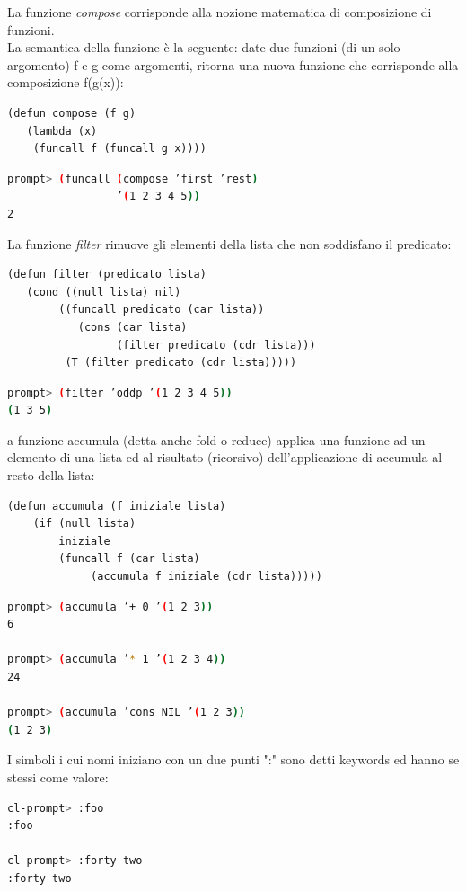 \documentclass[a4paper,12pt, oneside]{book}
\begin{document}
La funzione \textit{compose} corrisponde alla nozione matematica di
composizione di funzioni. \\La semantica della funzione è la seguente: date due funzioni (di
un solo argomento) f e g come argomenti, ritorna una nuova
funzione che corrisponde alla composizione f(g(x)):
\begin{verbatim}
(defun compose (f g)
   (lambda (x)
    (funcall f (funcall g x))))
\end{verbatim}
\begin{shaded}
\begin{lstlisting}[language=bash]
prompt> (funcall (compose ’first ’rest)
                 ’(1 2 3 4 5))
2
\end{lstlisting}
\end{shaded}
La funzione \textit{filter} rimuove gli elementi della lista che non soddisfano il predicato:
\begin{verbatim}
(defun filter (predicato lista)
   (cond ((null lista) nil)
        ((funcall predicato (car lista))
           (cons (car lista)
                 (filter predicato (cdr lista)))
         (T (filter predicato (cdr lista)))))
\end{verbatim}
\begin{shaded}
\begin{lstlisting}[language=bash]
prompt> (filter ’oddp ’(1 2 3 4 5))
(1 3 5)
\end{lstlisting}
\end{shaded}
a funzione accumula (detta anche fold o reduce) applica una funzione ad
un elemento di una lista ed al risultato (ricorsivo) dell'applicazione di accumula
al resto della lista:
\begin{verbatim}
(defun accumula (f iniziale lista)
    (if (null lista)
        iniziale
        (funcall f (car lista)
             (accumula f iniziale (cdr lista)))))
\end{verbatim}
\begin{shaded}
\begin{lstlisting}[language=bash]
prompt> (accumula ’+ 0 ’(1 2 3))
6

prompt> (accumula ’* 1 ’(1 2 3 4))
24

prompt> (accumula ’cons NIL ’(1 2 3))
(1 2 3)
\end{lstlisting}
\end{shaded}
I simboli i cui nomi iniziano con un due punti ":" sono detti
keywords ed hanno se stessi come valore:
\begin{shaded}
\begin{lstlisting}[language=bash]
cl-prompt> :foo
:foo
 
cl-prompt> :forty-two
:forty-two
\end{lstlisting}
\end{shaded}
\end{document}
